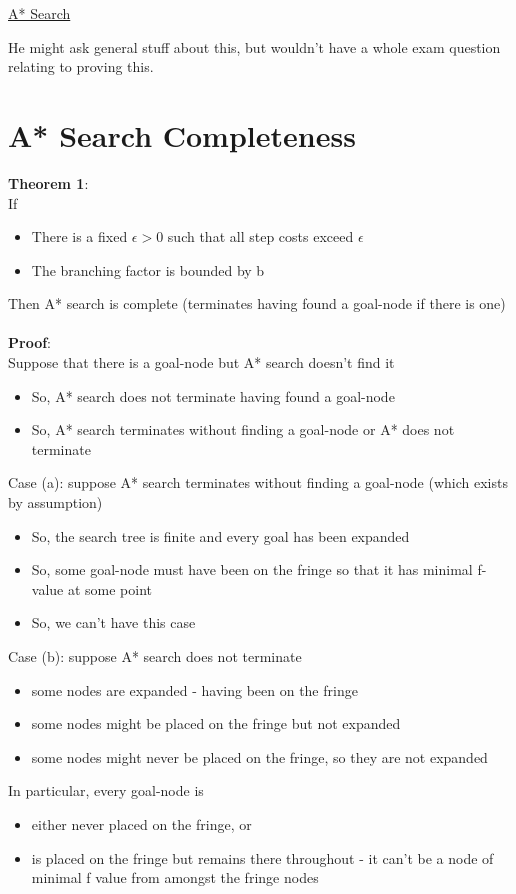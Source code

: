 \documentclass{article}[18pt]
\begin{document}
\begin{center}
\underline{\huge A* Search}
\end{center}
He might ask general stuff about this, but wouldn't have a whole exam question relating to proving this.
\section{A* Search Completeness}
\textbf{Theorem 1}:\\
If
\begin{itemize}
	\item There is a fixed $\epsilon>0$ such that all step costs exceed $\epsilon$
	\item The branching factor is bounded by b
\end{itemize}
Then A* search is complete (terminates having found a goal-node if there is one)\\
\\
\textbf{Proof}:\\
Suppose that there is a goal-node but A* search doesn't find it
\begin{itemize}
	\item So, A* search does not terminate having found a goal-node
	\item So, A* search terminates without finding a goal-node or A* does not terminate
\end{itemize}
Case (a): suppose A* search terminates without finding a goal-node (which exists by assumption)
\begin{itemize}
	\item So, the search tree is finite and every goal has been expanded
	\item So, some goal-node must have been on the fringe so that it has minimal f-value at some point
	\item So, we can't have this case
\end{itemize}
Case (b): suppose A* search does not terminate
\begin{itemize}
	\item some nodes are expanded - having been on the fringe
	\item some nodes might be placed on the fringe but not expanded
	\item some nodes might never be placed on the fringe, so they are not expanded
\end{itemize}
In particular, every goal-node is
\begin{itemize}
	\item either never placed on the fringe, or
	\item is placed on the fringe but remains there throughout - it can't be a node of minimal f value from amongst the fringe nodes
\end{itemize}
\end{document}
